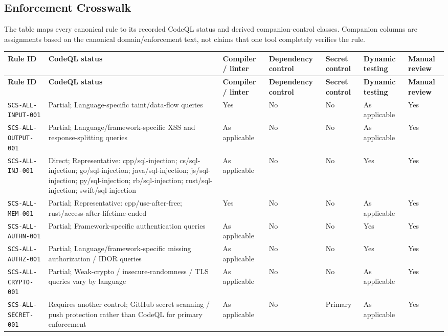 \documentclass[10pt,letterpaper]{article}
\newcommand{\code}[1]{\begingroup\small\ttfamily\def\UrlFont{\ttfamily}\nolinkurl{#1}\endgroup}
\begin{document}
\begin{landscape}
\section{Enforcement Crosswalk}
The table maps every canonical rule to its recorded CodeQL status and derived companion-control classes. Companion columns are assignments based on the canonical domain/enforcement text, not claims that one tool completely verifies the rule.
\scriptsize
\begin{longtable}{@{}P{1.4in}P{1.35in}P{1.1in}P{1.1in}P{0.95in}P{1.3in}P{1.0in}@{}}
\toprule
\textbf{Rule ID} & \textbf{CodeQL status} & \textbf{Compiler / linter} & \textbf{Dependency control} & \textbf{Secret control} & \textbf{Dynamic testing} & \textbf{Manual review}\\
\midrule
\endfirsthead
\toprule
\textbf{Rule ID} & \textbf{CodeQL status} & \textbf{Compiler / linter} & \textbf{Dependency control} & \textbf{Secret control} & \textbf{Dynamic testing} & \textbf{Manual review}\\
\midrule
\endhead
\code{SCS-ALL-INPUT-001} & Partial; Language-specific taint/data-flow queries & Yes & No & No & As applicable & Yes\\
\code{SCS-ALL-OUTPUT-001} & Partial; Language/framework-specific XSS and response-splitting queries & As applicable & No & No & As applicable & Yes\\
\code{SCS-ALL-INJ-001} & Direct; Representative: cpp/sql-injection; cs/sql-injection; go/sql-injection; java/sql-injection; js/sql-injection; py/sql-injection; rb/sql-injection; rust/sql-injection; swift/sql-injection & As applicable & No & No & Yes & Yes\\
\code{SCS-ALL-MEM-001} & Partial; Representative: cpp/use-after-free; rust/access-after-lifetime-ended & Yes & No & No & As applicable & Yes\\
\code{SCS-ALL-AUTHN-001} & Partial; Framework-specific authentication queries & As applicable & No & No & Yes & Yes\\
\code{SCS-ALL-AUTHZ-001} & Partial; Language/framework-specific missing authorization / IDOR queries & As applicable & No & No & Yes & Yes\\
\code{SCS-ALL-CRYPTO-001} & Partial; Weak-crypto / insecure-randomness / TLS queries vary by language & As applicable & No & No & As applicable & Yes\\
\code{SCS-ALL-SECRET-001} & Requires another control; GitHub secret scanning / push protection rather than CodeQL for primary enforcement & As applicable & No & Primary & As applicable & Yes\\

\end{longtable}
\end{landscape}
\end{document}

